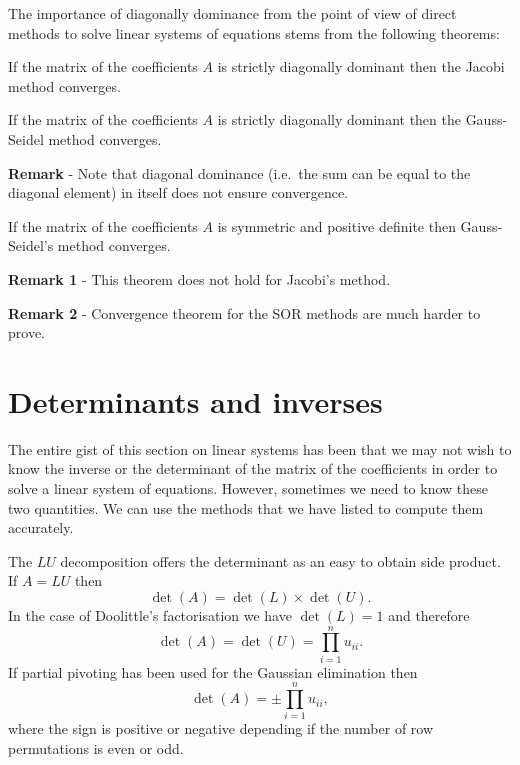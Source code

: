 The importance of diagonally dominance from the point of view of
direct methods to solve linear systems of equations stems from the
following theorems:

\begin{theorem}
If the matrix of the coefficients $A$ is strictly diagonally dominant
then the Jacobi method converges.
\end{theorem}

\medskip

\begin{theorem}
If the matrix of the coefficients $A$ is strictly
diagonally dominant then the Gauss-Seidel method converges.
\end{theorem}

\noindent
\textbf{Remark} - Note that diagonal dominance (i.e.\ the sum can be
equal to the diagonal element) in itself does not ensure convergence.

\smallskip

\begin{theorem}
If the matrix of the coefficients $A$ is
symmetric and positive definite then Gauss-Seidel's method converges.
\end{theorem}

\noindent
\textbf{Remark 1} - This theorem does not hold for Jacobi's method.

\noindent
\textbf{Remark 2} - Convergence theorem for the SOR methods are much
harder to prove.

\section{Determinants and inverses}

The entire gist of this section on linear systems has been that we may
not wish to know the inverse or the determinant of the matrix of the
coefficients in order to solve a linear system of equations.
However, sometimes we need to know these two quantities.  We can use
the methods that we have listed to compute them accurately.

The $LU$ decomposition offers the determinant as an easy to obtain side
product.  If $A = L U$ then
%
\begin{equation*}
  \det(A) = \det(L) \times \det(U).
\end{equation*}
%
In the case of Doolittle's factorisation we have $\det(L) = 1$ and
therefore
%
\begin{equation*}
\det(A) = \det(U) = \prod_{i=1}^n u_{i i} . 
\end{equation*}
%
If partial pivoting has been used for the Gaussian elimination then
%
\begin{equation*}
  \det(A) = \pm \prod_{i=1}^n u_{i i} , 
\end{equation*}
%
where the sign is positive or negative depending if the number of row
permutations is even or odd.

